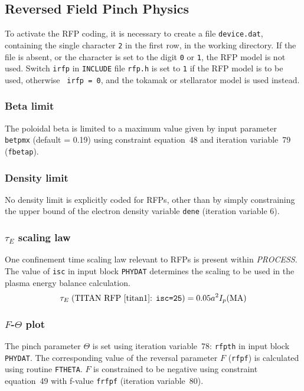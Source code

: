 \documentclass[11pt,a4paper]{report}
\makeatletter
\newcommand{\PSD}{\mbox{\it PROCESS}\@.\/ }
\makeatother
\begin{document}
\subsection{Reversed Field Pinch Physics}

To activate the RFP coding, it is necessary to create a file {\tt device.dat},
containing the single character {\tt 2} in the first row, in the working
directory. If the file is absent, or the character is set to the digit {\tt 0}
or {\tt 1}, the RFP model is not used. Switch {\tt irfp} in {\tt INCLUDE} file
{\tt rfp.h} is set to {\tt 1} if the RFP model is to be used, otherwise {\tt
irfp = 0}, and the tokamak or stellarator model is used instead.
\setlength{\parskip}{0mm}

\subsubsection{Beta limit}
The poloidal beta is limited to a maximum value given by input parameter
\texttt{betpmx} (default = 0.19) using constraint equation~48 and iteration
variable~79 (\texttt{fbetap}).

\subsubsection{Density limit}
No density limit is explicitly coded for RFPs, other than by simply
constraining the upper bound of the electron density variable \texttt{dene}
(iteration variable 6).

\subsubsection{$\tau_E$ scaling law}
One confinement time scaling law relevant to RFPs is present
within \PSD The value of {\tt isc} in input block {\tt PHYDAT} determines
the scaling to be used in the plasma energy balance calculation.
\[
\tau_E\; (\mbox{TITAN RFP~\cite{titan1}: {\tt isc=25}})
 = 0.05 a^2 I_p(\mathrm{MA})
\]

\subsubsection{$F$-$\Theta$ plot}
The pinch parameter $\Theta$ is set using iteration variable~78:
\texttt{rfpth} in input block \texttt{PHYDAT}. The corresponding value of the
reversal parameter $F$ (\texttt{rfpf}) is calculated using routine
\texttt{FTHETA}. $F$ is constrained to be negative using constraint
equation~49 with f-value \texttt{frfpf} (iteration variable~80).
\end{document}

